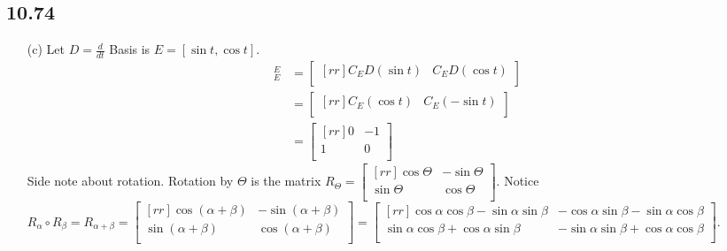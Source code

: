 \documentclass{report}
\theoremstyle{plain}
\theoremstyle{definition}
\theoremstyle{plain}
\begin{document}
\subsection{10.74}
\begin{enumerate}
\item[(c)] Let $D=\frac{d}{dt}$ Basis is $E=[\sin t, \cos t]$.\\
\begin{align*}
	[D]_E^E &=\begin{bmatrix}[rr]C_ED(\sin t) & C_ED(\cos t)\\\end{bmatrix}\\
	&=\begin{bmatrix}[rr]C_E(\cos t) & C_E(-\sin t)\\\end{bmatrix}\\
	&=\begin{bmatrix}[rr]0&-1\\1&0\\\end{bmatrix}
\end{align*}
Side note about rotation. Rotation by $\Theta$ is the matrix $R_\Theta = \begin{bmatrix}[rr]\cos\Theta & -\sin\Theta\\\sin\Theta & \cos\Theta\\\end{bmatrix}$. Notice $R_\alpha \circ R_\beta = R_{\alpha + \beta} = \begin{bmatrix}[rr]\cos (\alpha + \beta) & -\sin (\alpha + \beta)\\\sin (\alpha + \beta) & \cos (\alpha + \beta)\\\end{bmatrix} = \begin{bmatrix}[rr]\cos\alpha\cos\beta - \sin\alpha\sin\beta & -\cos\alpha\sin\beta-\sin\alpha\cos\beta\\\sin\alpha\cos\beta + \cos\alpha\sin\beta & -\sin\alpha\sin\beta + \cos\alpha\cos\beta\\\end{bmatrix}$.
\end{enumerate}
\end{document}
